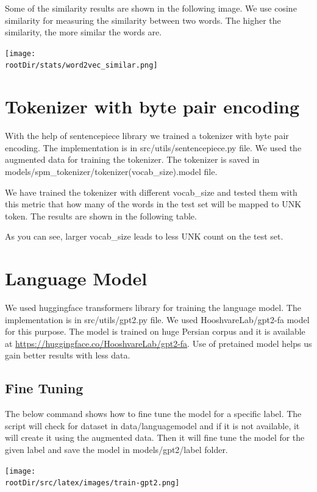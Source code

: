 \documentclass[12pt, letterpaper]{article}
\def\rootDir{../..}
\begin{document}
    Some of the similarity results are shown in the following image. We use cosine similarity for measuring the similarity between two words. The higher the similarity, the more similar the words are.
    \begin{center}
        \texttt{[image: \\rootDir/stats/word2vec\_similar.png]}
    \end{center}

    \section{Tokenizer with byte pair encoding}\label{sec:tokenizer-with-byte-pair-encoding}
    With the help of sentencepiece library we trained a tokenizer with byte pair encoding. The implementation is in src\slash utils\slash sentencepiece.py file. We used the augmented data for training the tokenizer. The tokenizer is saved in models\slash spm\_tokenizer\slash tokenizer(vocab\_size).model file.
    
    We have trained the tokenizer with different vocab\_size and tested them with this metric that how many of the words in the test set will be mapped to UNK token. The results are shown in the following table.
    \begin{center}
        \csvreader[tabular=|c|c|,
        table head=\hline vocab\_size & UNK count\\ \hline,
        late after line=\\ \hline
        ]{\rootDir/stats/tokenizer_stats.csv}{}{
            \csvcoli & \csvcolii
        }
    \end{center}
    As you can see, larger vocab\_size leads to less UNK count on the test set.

    \section{Language Model}\label{sec:language-model}
    We used huggingface transformers library for training the language model. The implementation is in src\slash utils\slash gpt2.py file. We used HooshvareLab/gpt2-fa model for this purpose. The model is trained on huge Persian corpus and it is available at \url{https://huggingface.co/HooshvareLab/gpt2-fa}. Use of pretained model helps us gain better results with less data.
    
    \subsection{Fine Tuning}\label{subsec:fine-tuning-gpt2}
    The below command shows how to fine tune the model for a specific label. The script will check for dataset in data\slash languagemodel and if it is not available, it will create it using the augmented data. Then it will fine tune the model for the given label and save the model in models\slash gpt2\slash label folder.
    \begin{center}
        \texttt{[image: \\rootDir/src/latex/images/train-gpt2.png]}
    \end{center}
\end{document}
